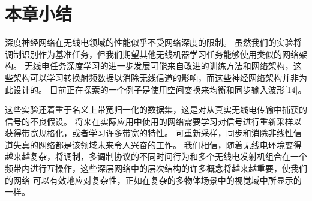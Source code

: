 %
%
%
%
%
%
%
%

\section{本章小结}
深度神经网络在无线电领域的性能似乎不受网络深度的限制。 虽然我们的实验将调制识别作为基准任务，但我们期望其他无线机器学习任务能够使用类似的网络架构。 无线电任务深度学习的进一步发展可能来自改进的训练方法和网络架构，这些架构可以学习转换射频数据以消除无线信道的影响，而这些神经网络架构并非为此设计的。 目前正在探索的一个例子是使用空间变换来均衡和同步输入波形[14]。\par

这些实验还着重于名义上带宽归一化的数据集，这是对从真实无线电传输中捕获的信号的不良假设。 将来在实际应用中使用的网络需要学习对信号进行重新采样以获得带宽规格化，或者学习许多带宽的特性。 可重新采样，同步和消除非线性信道失真的网络都是该领域未来令人兴奋的工作。 我们相信，随着无线电环境变得越来越复杂，将调制，多调制协议的不同时间行为和多个无线电发射机组合在一个频带内进行互操作，这些深层网络中的层次结构的许多概念将越来越重要，使我们的网络 可以有效地应对复杂性，正如在复杂的多物体场景中的视觉域中所显示的一样。\par